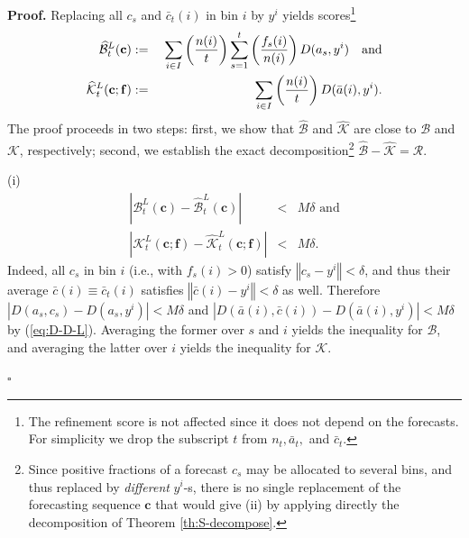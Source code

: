 \documentclass[12pt,a4paper,notitlepage]{article}
\newenvironment{proof}[1][Proof]{\noindent\textbf{#1.} }{\hfill $\square$}
\begin{document}
\begin{proof}
Replacing all $c_{s}$ and $\bar{c}_{t}(i)$ in bin $i$ by $y^{i}$ yields
scores\footnote{%
The refinement score is not affected since it does not depend on the
forecasts. For simplicity we drop the subscript $t$ from $n_{t},\bar{a}_{t},$
and $\bar{c}_{t}$.}%
\begin{eqnarray*}
\widehat{\mathcal{B}}_{t}^{L}(\mathbf{c}) &%
{\;:=\;}%
&\sum_{i\in I}\left( \frac{n(i)}{t}\right) \sum_{s=1}^{t}\left( \frac{%
f_{s}(i)}{n(i)}\right) D(a_{s},y^{i})\text{\ \ \ and} \\
\widehat{\mathcal{K}}_{t}^{L}(\mathbf{c};\mathbf{f}) &%
{\;:=\;}%
&\sum_{i\in I}\left( \frac{n(i)}{t}\right) D(\bar{a}(i),y^{i}).
\end{eqnarray*}%
The proof proceeds in two steps: first, we show that $\widehat{\mathcal{B}}$
and $\widehat{\mathcal{K}}$ are close to $\mathcal{B}$ and $\mathcal{K}$,
respectively; second, we establish the exact decomposition\footnote{%
Since positive fractions of a forecast $c_{s}$ may be allocated to several
bins, and thus replaced by \emph{different} $y^{i}$-s, there is no single
replacement of the forecasting sequence $\mathbf{c}$ that would give (ii) by
applying directly the decomposition of Theorem \ref{th:S-decompose}.} $%
\widehat{\mathcal{B}}-\widehat{\mathcal{K}}=\mathcal{R}$.

(i) 
\begin{eqnarray*}
\left\vert \mathcal{B}_{t}^{L}(\mathbf{c})-\widehat{\mathcal{B}}_{t}^{L}(%
\mathbf{c})\right\vert &<&M\delta \text{\ \ \ and} \\
\left\vert \mathcal{K}_{t}^{L}(\mathbf{c};\mathbf{f})-\widehat{\mathcal{K}}%
_{t}^{L}(\mathbf{c};\mathbf{f})\right\vert &<&M\delta .
\end{eqnarray*}%
Indeed, all $c_{s}$ in bin $i$ (i.e., with $f_{s}(i)>0$) satisfy $\left\Vert
c_{s}-y^{i}\right\Vert <\delta $, and thus their average $\bar{c}(i)\equiv 
\bar{c}_{t}(i)$ satisfies $\left\Vert \bar{c}(i)-y^{i}\right\Vert <\delta $
as well. Therefore $\left\vert D(a_{s},c_{s})-D(a_{s},y^{i})\right\vert
<M\delta $ and $\left\vert D(\bar{a}(i),\bar{c}(i))-D(\bar{a}%
(i),y^{i})\right\vert <M\delta $ by (\ref{eq:D-D-L}). Averaging the former
over $s$ and $i$ yields the inequality for $\mathcal{B}$, and averaging the
latter over $i$ yields the inequality for $\mathcal{K}$.


\end{proof}
\end{document}
